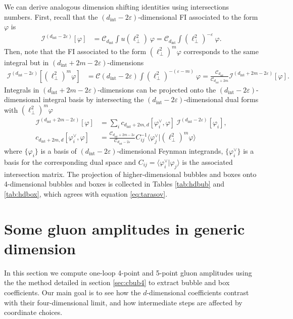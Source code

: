 \documentclass[11pt]{article}
\newcommand{\la}{\langle}
\newcommand{\ra}{\rangle}
\newcommand{\dint}{d_\text{int}}
\newcommand{\C}{\mathcal{C}}
\newcommand{\vphi}{\varphi}
\newcommand{\vep}{\varepsilon}
\begin{document}
We can derive analogous dimension shifting identities using intersections numbers. First, recall that the $(\dint-2\vep)$-dimensional FI associated to the form $\vphi$ is 
\begin{align}
	\mathscr{I}^{(\dint-2\vep)}[\vphi ]	&= \C_{\dint} \int u(\ell_\perp^2)\ \vphi 
		= \C_{\dint} \int \left(\ell_\perp^2\right)^{-\vep}\ \vphi .
\end{align}
Then, note that the FI associated to the form $(\ell_\perp^2)^m \vphi$ corresponds to the same integral but in $(\dint+2m-2\vep)$-dimensions
\begin{align}
	\mathscr{I}^{(\dint-2\vep)} [(\ell_\perp^2)^m \vphi]
	&= \C(\dint-2\vep) \int \left(\ell_\perp^2\right)^{-(\vep-m)}\ \vphi 
		=\frac{\C_{\dint}}{\C_{\dint+2m}} \mathscr{I}^{(\dint + 2m - 2\vep)}[\vphi] .
\end{align}
Integrals in $(\dint+2m-2\vep)$-dimensions can be projected onto the $(\dint-2\vep)$-dimensional integral basis by intersecting the $(\dint-2\vep)$-dimensional dual forms with $(\ell_\perp^2)^m \vphi$
\begin{align}
	\mathscr{I}^{(\dint + 2m - 2\vep)}[\vphi] 
	&= \sum_i c_{\dint+2m,d}[\vphi^\vee_i,\vphi]\ \mathscr{I}^{(\dint - 2\vep)}[\vphi_i],
	\\
	c_{\dint+2m,d}[\vphi^\vee_i,\vphi] 
	&= \frac{\C_{\dint+2m-2\vep}}{\C_{\dint-2\vep}}  C^{-1}_{ij} \la \vphi^\vee_j \vert (\ell_\perp^2)^m \vphi \ra
\end{align}
where $\{\vphi_i\}$ is a basis of $(\dint-2\vep)$-dimensional Feynman integrands, $\{\vphi^\vee_i\}$ is a basis for the corresponding dual space and $C_{ij} = \la \vphi^\vee_i \vert \vphi_j \ra$ is the associated intersection matrix. The projection of higher-dimensional bubbles and boxes onto 4-dimensional bubbles and boxes is collected in Tables \ref{tab:hdbub} and \ref{tab:hdbox}, which agrees with equation \eqref{eq:tarasov}. 




\section{Some gluon amplitudes in generic dimension \label{sec:gluon amplitudes}}

In this section we compute one-loop 4-point and 5-point gluon amplitudes using the 
the method detailed in section \ref{sec:cbub4} to extract bubble and box coefficients.
Our main goal is to see how the $d$-dimensional coefficients contrast with their four-dimensional limit,
and how intermediate steps are affected by coordinate choices.
\end{document}
